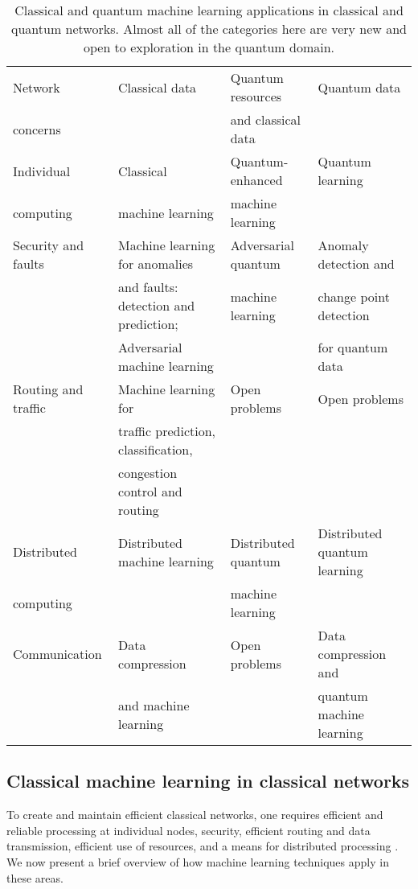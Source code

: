 \begin{table*}[htbp!]
\begin{tabular}{|l|l|l|l|}
\hline
Network  & Classical data & Quantum resources  & Quantum data \\
concerns & & and classical data & \\
\hline
\hline
Individual & Classical   & Quantum-enhanced  & Quantum learning  \\ 
computing & machine learning & machine learning & \\
\hline 
Security and faults & Machine learning for anomalies & Adversarial quantum & Anomaly detection and  \\
& and faults: detection and prediction; & machine learning  & change point detection \\
& Adversarial machine learning &  & for quantum data \\
\hline 
Routing and traffic & Machine learning for  & Open problems & Open problems \\
& traffic prediction, classification, &   &  \\
& congestion control and routing & & \\
\hline 
Distributed  & Distributed machine learning & Distributed quantum & Distributed quantum learning \\
computing & & machine learning & \\
\hline 
 Communication & Data compression & Open problems & Data compression and \\
 & and machine learning & & quantum machine learning \\
\hline 
\end{tabular}
\captionspacetab \caption{\label{tab:CommTable2} Classical and quantum machine learning applications in classical and quantum networks. Almost all of the categories here are very new and open to exploration in the quantum domain.}
\end{table*}
\startalgtable

\subsection{Classical machine learning in classical networks}

To create and maintain efficient classical networks, one requires efficient and reliable processing at individual nodes, security, efficient routing and data transmission, efficient use of resources, and a means for distributed processing \cite{bib:boutaba2018comprehensive, bib:wang2018machine}. We now present a brief overview of how machine learning techniques apply in these areas. 

